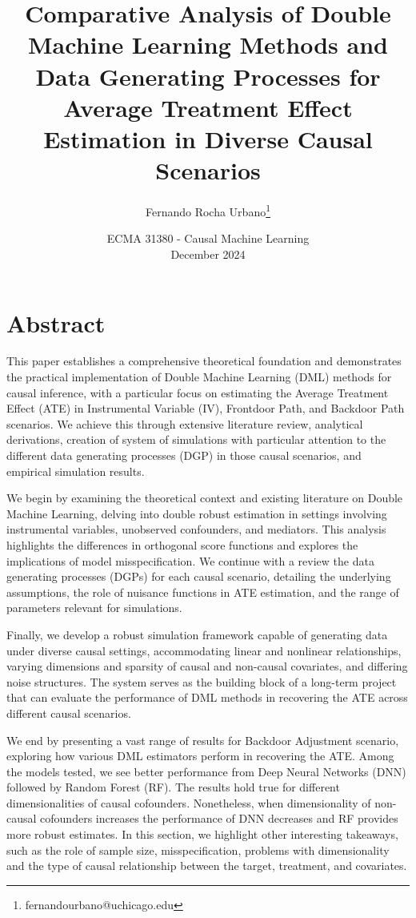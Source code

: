 \documentclass{article}
\title{Comparative Analysis of Double Machine Learning Methods and Data Generating Processes for Average Treatment Effect Estimation in Diverse Causal Scenarios}
\author{Fernando Rocha Urbano\footnote{fernandourbano@uchicago.edu}}
\date{
    ECMA 31380 - Causal Machine Learning \\ \vspace{.5cm} December 2024
}
\numberwithin{equation}{section}
\begin{document}
\begin{titlepage}
    \vfill
    \maketitle
    \vfill
\end{titlepage}

\section{Abstract}

This paper establishes a comprehensive theoretical foundation and demonstrates the practical implementation of Double Machine Learning (DML) methods for causal inference, with a particular focus on estimating the Average Treatment Effect (ATE) in Instrumental Variable (IV), Frontdoor Path, and Backdoor Path scenarios. We achieve this through extensive literature review, analytical derivations, creation of system of simulations with particular attention to the different data generating processes (DGP) in those causal scenarios, and empirical simulation results.

We begin by examining the theoretical context and existing literature on Double Machine Learning, delving into double robust estimation in settings involving instrumental variables, unobserved confounders, and mediators. This analysis highlights the differences in orthogonal score functions and explores the implications of model misspecification. We continue with a review the data generating processes (DGPs) for each causal scenario, detailing the underlying assumptions, the role of nuisance functions in ATE estimation, and the range of parameters relevant for simulations.

Finally, we develop a robust simulation framework capable of generating data under diverse causal settings, accommodating linear and nonlinear relationships, varying dimensions and sparsity of causal and non-causal covariates, and differing noise structures. The system serves as the building block of a long-term project that can evaluate the performance of DML methods in recovering the ATE across different causal scenarios.

We end by presenting a vast range of results for Backdoor Adjustment scenario, exploring how various DML estimators perform in recovering the ATE. Among the models tested, we see better performance from Deep Neural Networks (DNN) followed by Random Forest (RF). The results hold true for different dimensionalities of causal cofounders. Nonetheless, when dimensionality of non-causal cofounders increases the performance of DNN decreases and RF provides more robust estimates. In this section, we highlight other interesting takeaways, such as the role of sample size, misspecification, problems with dimensionality and the type of causal relationship between the target, treatment, and covariates.
\end{document}
